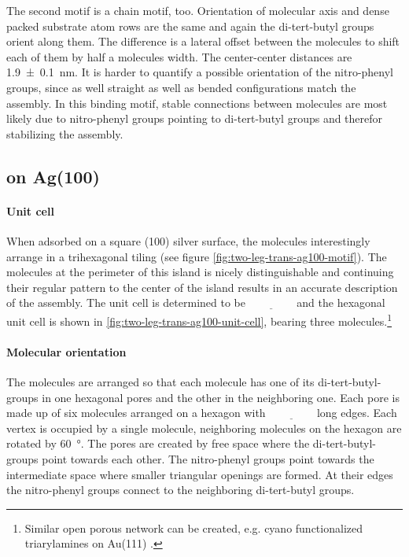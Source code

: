 	The second motif is a chain motif, too. Orientation of molecular axis and dense packed substrate atom rows are the same and again the di-tert-butyl groups orient along them. The difference is a lateral offset between the molecules to shift each of them by half a molecules width. The center-center distances are \SI{1.9 \pm 0.1}{\nano \meter}. It is harder to quantify a possible orientation of the nitro-phenyl groups, since as well straight as well as bended configurations match the assembly. In this binding motif, stable connections between molecules are most likely due to nitro-phenyl groups pointing to di-tert-butyl groups and therefor stabilizing the assembly.
	
	\subsection{on Ag(100)}
	\paragraph{Unit cell}
	When adsorbed on a square (100) silver surface, the molecules interestingly arrange in a trihexagonal tiling (see figure \ref{fig:two-leg-trans-ag100-motif}). The molecules at the perimeter of this island is nicely distinguishable and continuing their regular pattern to the center of the island results in an accurate description of the assembly. The unit cell is determined to be $\underline{\qquad \qquad}$ and the hexagonal unit cell is shown in \autoref{fig:two-leg-trans-ag100-unit-cell}, bearing three molecules.\footnote{Similar open porous network can be created, e.g. cyano functionalized triarylamines on Au(111) \cite{gottardi_cyano-functionalized_2014}.}
	
	\paragraph{Molecular orientation}
	The molecules are arranged so that each molecule has one of its di-tert-butyl-groups in one hexagonal pores and the other in the neighboring one. Each pore is made up of six molecules arranged on a hexagon with $\underline{\qquad \qquad}$ long edges. Each vertex is occupied by a single molecule, neighboring molecules on the hexagon are rotated by \SI{60}{\degree}. The pores are created by free space where the di-tert-butyl-groups point towards each other. The nitro-phenyl groups point towards the intermediate space where smaller triangular openings are formed. At their edges the nitro-phenyl groups connect to the neighboring di-tert-butyl groups.
	
